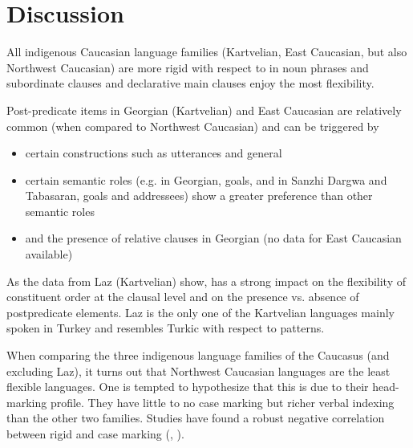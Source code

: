 \documentclass[output=paper,colorlinks,citecolor=brown,draftmode]{langscibook}
\begin{document}
\section{Discussion}\label{EC:ss:4}

All indigenous Caucasian language families (Kartvelian, East Caucasian, but also Northwest Caucasian) are more rigid with respect to  in noun phrases and subordinate clauses and declarative main clauses enjoy the most flexibility.

Post-predicate items in Georgian (Kartvelian) and East Caucasian are relatively common (when compared to Northwest Caucasian) and can be triggered by 

\begin{itemize}
\item certain constructions such as  utterances and general 
\item certain semantic roles (e.g. in Georgian, goals, and in Sanzhi Dargwa and Tabasaran, goals and addressees) show a greater preference than other semantic roles
\item {} and the presence of relative clauses in Georgian (no data for East Caucasian available)
\end{itemize}

As the data from Laz (Kartvelian) show,  has a strong impact on the flexibility of constituent order at the clausal level and on the presence vs. absence of postpredicate elements. Laz is the only one of the Kartvelian languages mainly spoken in Turkey and resembles Turkic with respect to  patterns.

When comparing the three indigenous language families of the Caucasus (and excluding Laz), it turns out that Northwest Caucasian languages are the least flexible languages. One is tempted to hypothesize that this is due to their head-marking profile. They have little to no case marking but richer verbal indexing than the other two families. Studies have found a robust negative correlation between rigid  and case marking (\citealt{sinnemaki2014complexity}, \citealt{levshina_cross-linguistic_2021}). 
\end{document}
